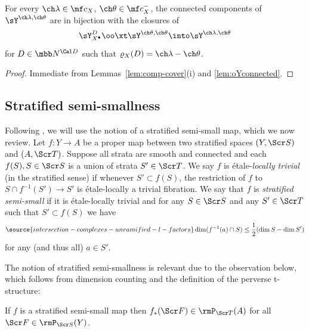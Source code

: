 \begin{cor}
\notready \label{cor:Ycomp2}
For every $\ch\lambda\in\mf c_X$, $\ch\theta\in\mf c_X^-$, the connected components of $\sY^{\ch\lambda,\ch\theta}$ are
in bijection with the closures of
\[ \sY^{D}_{X^\bullet} \oo\xt \sY^{\ch\theta,\ch\theta} \into \sY^{\ch\lambda,\ch\theta} \]
for $D\in \mbb N^{\Cal D}$ such that $\varrho_X(D) = \ch\lambda-\ch\theta$.
\end{cor}
\begin{proof}
Immediate from Lemmas~\ref{lem:comp-cover}(i) and \ref{lem:oYconnected}.
\end{proof}


\subsection{Stratified semi-smallness} \label{sect:semismall}

Following \cite[\S 4]{MV}, we will use
the notion of a stratified semi-small map, which we now review.
Let $f : Y \to A$ be a proper map between two stratified spaces
$(Y,\Scr S)$ and $(A,\Scr T)$. Suppose all strata
are smooth and connected and each $f(S), S\in \Scr S$ is a union of strata
$S' \in \Scr T$. We say $f$ is \'etale-\emph{locally trivial}
(in the stratified sense) if whenever $S' \subset f(S)$, the restriction of
$f$ to $S\cap f^{-1}(S') \to S'$ is \'etale-locally
a trivial fibration. We say that $f$ is \emph{stratified semi-small}
if it is \'etale-locally trivial and
for any $S\in \Scr S$ and any $S'\in \Scr T$ such that
$S' \subset f(S)$ we have
\begin{equation} \label{e:ss-ineq}
\source{intersection-complexes-unramified-l-factors}
    \dim ( f^{-1}(a) \cap S) \le \frac 1 2 (\dim S - \dim S')
\end{equation}
for any (and thus all) $a\in S'$.

The notion of stratified semi-smallness is relevant due to
the observation below, which follows from dimension counting and the
definition of the perverse t-structure:

\begin{lem}[{\cite[Lemma 4.3]{MV}}]
\notready  \label{lem:semismallperverse}
If $f$ is a stratified semi-small map then $f_*(\Scr F) \in \rmP_{\Scr T}(A)$ for all
$\Scr F \in \rmP_{\Scr S}(Y)$.
\end{lem}

